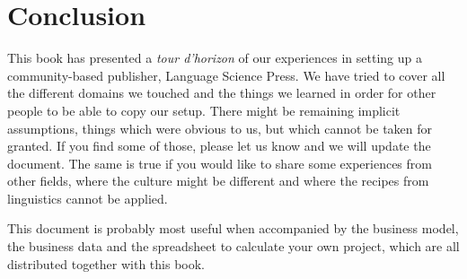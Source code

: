 \documentclass[nonflat,modfonts,output=book] {langsci/langscibook}
\begin{document}
\chapter{Conclusion} 
This book has presented a \textit{tour d'horizon} of our experiences in setting up a community-based publisher, Language Science Press. We have tried to cover all the different domains we touched and the things we learned in order for other people to be able to copy our setup. 
There might be remaining implicit assumptions, things which were obvious to us, but which cannot be taken for granted. If you find some of those, please let us know and we will update the document. The same is true if  you would like to share some experiences from other fields, where the culture might be different and where the recipes from linguistics cannot be applied. 

This document is probably most useful when accompanied by the business model, the business data and the spreadsheet to calculate your own project, which are all distributed together with this book. 
\end{document}
